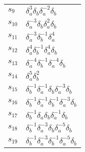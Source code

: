 \documentclass{article}
\begin{document}
\begin{center}
\begin{tabular}{ll}
$s_{9}$ & $\delta_a^{3}\delta_b^{}\delta_a^{-2}\delta_b^{}$ \\
$s_{10}$ & $\delta_a^{-3}\delta_b^{}\delta_a^{2}\delta_b^{}$ \\
$s_{11}$ & $\delta_a^{-3}\delta_b^{-1}\delta_a^{4}$ \\
$s_{12}$ & $\delta_a^{4}\delta_b^{-1}\delta_a^{4}\delta_b^{}$ \\
$s_{13}$ & $\delta_a^{-4}\delta_b^{-1}\delta_a^{-4}\delta_b^{}$ \\
$s_{14}$ & $\delta_a^{5}\delta_b^{2}$ \\
$s_{15}$ & $\delta_b^{-1}\delta_a^{-1}\delta_b^{}\delta_a^{-3}\delta_b^{}$ \\
$s_{16}$ & $\delta_b^{-1}\delta_a^{-1}\delta_b^{-1}\delta_a^{-3}\delta_b^{}$ \\
$s_{17}$ & $\delta_b^{-1}\delta_a^{}\delta_b^{}\delta_a^{-1}\delta_b^{}$ \\
$s_{18}$ & $\delta_b^{-1}\delta_a^{-3}\delta_b^{}\delta_a^{-5}\delta_b^{}$ \\
$s_{19}$ & $\delta_b^{-1}\delta_a^{-3}\delta_b^{-1}\delta_a^{-5}\delta_b^{}$ \\
\bottomrule
\end{tabular}
\end{center}

\thispagestyle{empty}
\end{document}
